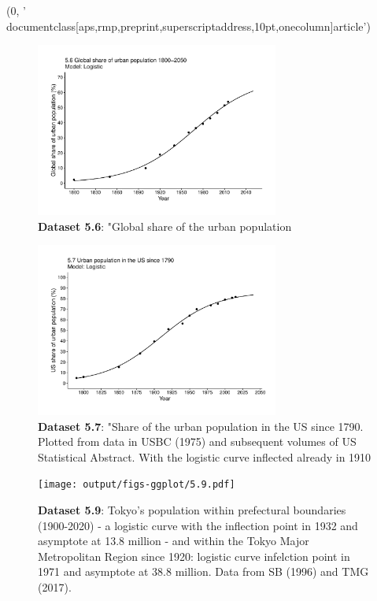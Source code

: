 (0, '\\documentclass[aps,rmp,preprint,superscriptaddress,10pt,onecolumn]{article}\n')
\begin{document}
\begin{figure}[h]
\includegraphics[width=8cm]{output/figs-ggplot/5.6.pdf}
\caption{\textbf{Dataset 5.6}: "Global share of the urban population}
\end{figure}
	
\begin{figure}[h]
\includegraphics[width=8cm]{output/figs-ggplot/5.7.pdf}
\caption{\textbf{Dataset 5.7}: "Share of the urban population in the US since 1790. Plotted from data in USBC (1975) and subsequent volumes of US Statistical Abstract. With the logistic curve inflected already in 1910}
\end{figure}
	
\begin{figure}[h]
\texttt{[image: output/figs-ggplot/5.9.pdf]}
\caption{\textbf{Dataset 5.9}: Tokyo's population within prefectural boundaries (1900-2020) - a logistic curve with the inflection point in 1932 and asymptote at 13.8 million - and within the Tokyo Major Metropolitan Region since 1920: logistic curve infelction point in 1971 and asymptote at 38.8 million. Data from SB (1996) and TMG (2017). }
\end{figure}
	
\end{document}
